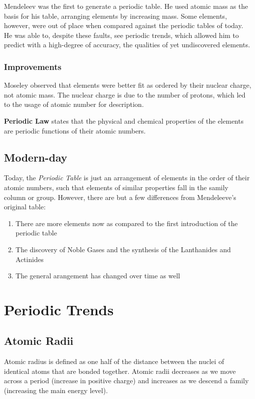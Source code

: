 Mendeleev was the first to generate a periodic table.  He used atomic mass as
the basis for his table, arranging elements by increasing mass.  Some elements,
however, were out of place when compared against the periodic tables of today.
He was able to, despite these faults, see periodic trends, which allowed him to
predict with a high-degree of accuracy, the qualities of yet undiscovered
elements.

\subsubsection{Improvements}
Moseley observed that elements were better fit as ordered by their nuclear
charge, not atomic mass.  The nuclear charge is due to the number of protons,
which led to the usage of atomic number for description.

\textbf{Periodic Law} states that the physical and chemical properties of the
elements are periodic functions of their atomic numbers.

\subsection{Modern-day}
Today, the \textit{Periodic Table} is just an arrangement of elements in the
order of their atomic numbers, such that elements of similar properties fall in
the samily column or group.  However, there are but a few differences from
Mendeleeve's original table:

\begin{enumerate}
  \item There are more elements now as compared to the first introduction of the
    periodic table
  \item The discovery of Noble Gases and the synthesis of the Lanthanides and
    Actinides
  \item The general arangement has changed over time as well
\end{enumerate}

\section{Periodic Trends}
\subsection{Atomic Radii}
Atomic radius is defined as one half of the distance between the nuclei of
identical atoms that are bonded together.  Atomic radii decreases as we move
across a period (increase in positive charge) and increases as we descend a
family (increasing the main energy level).

